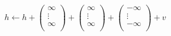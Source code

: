 \begin{equation}\label{fig-const-fun}
h \leftarrow  h + 
    \left(\begin{matrix}
    \infty \\
    \vdots \\
    \infty \\
\end{matrix}\right)
    + \left(\begin{matrix}
    \infty \\
    \vdots \\
    \infty \\
\end{matrix}\right)
    + \left(\begin{matrix}
    -\infty \\
    \vdots \\
    -\infty \\
\end{matrix}\right)
    + v
\end{equation}

